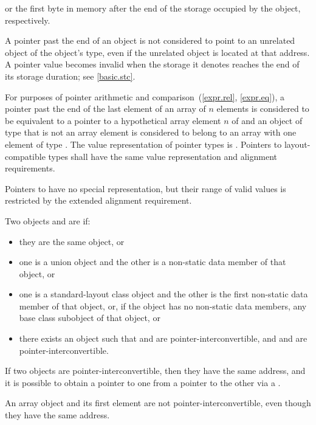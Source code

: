 or the first byte in memory
after the end of the storage occupied by the object,
respectively.
\begin{note}
A pointer past the end of an object
is not considered to point to an unrelated object
of the object's type,
even if the unrelated object is located at that address.
A pointer value becomes invalid
when the storage it denotes
reaches the end of its storage duration;
see \ref{basic.stc}.
\end{note}
For purposes of pointer arithmetic
and comparison~(\ref{expr.rel}, \ref{expr.eq}),
a pointer past the end of the last element of
an array  of $n$ elements
is considered to be equivalent to
a pointer to a hypothetical array element $n$ of  and
an object of type  that is not an array element
is considered to belong to an array with one element of type .
The value representation of
pointer types is . Pointers to
layout-compatible types shall
have the same value representation and alignment
requirements.
\begin{note}
Pointers to  have no special
representation, but their range of valid values is restricted by the extended
alignment requirement.
\end{note}

\pnum
Two objects  and  are  if:
\begin{itemize}
\item
they are the same object, or
\item
one is a union object and
the other is a non-static data member of that object, or
\item
one is a standard-layout class object and
the other is the first non-static data member of that object, or,
if the object has no non-static data members,
any base class subobject of that object, or
\item
there exists an object  such that
 and  are pointer-interconvertible, and
 and  are pointer-interconvertible.
\end{itemize}
If two objects are pointer-interconvertible,
then they have the same address,
and it is possible to obtain a pointer to one
from a pointer to the other
via a .
\begin{note}
An array object and its first element are not pointer-interconvertible,
even though they have the same address.
\end{note}

